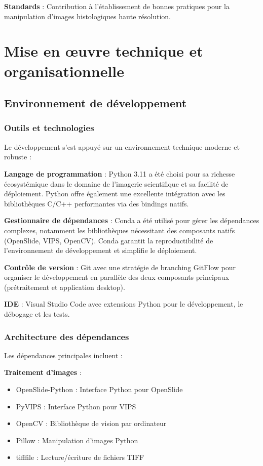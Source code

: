 \documentclass[12pt,a4paper]{report}
\begin{document}
\begin{}
\begin{}
\begin{}
\begin{}
\textbf{Standards} : Contribution à l'établissement de bonnes pratiques pour la manipulation d'images histologiques haute résolution.

\section{Mise en œuvre technique et organisationnelle}

\clearpage

\vspace{0.5em}

\subsection{Environnement de développement}

\subsubsection{Outils et technologies}

Le développement s'est appuyé sur un environnement technique moderne et robuste :

\textbf{Langage de programmation} : Python 3.11 a été choisi pour sa richesse écosystémique dans le domaine de l'imagerie scientifique et sa facilité de déploiement. Python offre également une excellente intégration avec les bibliothèques C/C++ performantes via des bindings natifs.

\textbf{Gestionnaire de dépendances} : Conda a été utilisé pour gérer les dépendances complexes, notamment les bibliothèques nécessitant des composants natifs (OpenSlide, VIPS, OpenCV). Conda garantit la reproductibilité de l'environnement de développement et simplifie le déploiement.

\textbf{Contrôle de version} : Git avec une stratégie de branching GitFlow pour organiser le développement en parallèle des deux composants principaux (prétraitement et application desktop).

\textbf{IDE} : Visual Studio Code avec extensions Python pour le développement, le débogage et les tests.

\subsubsection{Architecture des dépendances}

Les dépendances principales incluent :

\textbf{Traitement d'images} :
\begin{itemize}
\item OpenSlide-Python : Interface Python pour OpenSlide
\item PyVIPS : Interface Python pour VIPS
\item OpenCV : Bibliothèque de vision par ordinateur
\item Pillow : Manipulation d'images Python
\item tifffile : Lecture/écriture de fichiers TIFF
\end{itemize}


\end{}
\end{}
\end{}
\end{}
\end{document}
